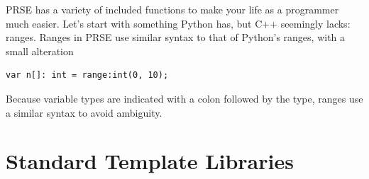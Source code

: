 \documentclass[letterpaper, 12pt]{article}
\begin{document}
PRSE has a variety of included functions to make your life as a programmer much easier. Let's start
with something Python has, but C++ seemingly lacks: ranges. Ranges in PRSE use similar syntax to
that of Python's ranges, with a small alteration

\begin{lstlisting}
var n[]: int = range:int(0, 10);
\end{lstlisting}

Because variable types are indicated with a colon followed by the type, ranges use a similar syntax
to avoid ambiguity. %


\section{Standard Template Libraries}
\end{document}
